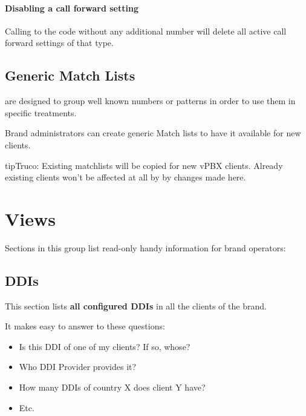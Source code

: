 \documentclass[letterpaper,10pt,spanish]{sphinxmanual}
\begin{document}
\paragraph{Disabling a call forward setting}

Calling to the code without any additional number will delete all active call forward settings of that type.


\subsection{Generic Match Lists}
\label{administration_portal/brand/settings/generic_match_lists:generic-match-lists}\label{administration_portal/brand/settings/generic_match_lists::doc}\label{administration_portal/brand/settings/generic_match_lists:brand-match-lists}
{\hyperref[administration_portal/client/vpbx/routing_tools/match_lists:id1]{}} are designed to group well known numbers or patterns in order to use them in specific treatments.

Brand administrators can create generic Match lists to have it available for new clients.

\begin{notice}{tip}{Truco:}
Existing matchlists will be copied for new vPBX clients. Already existing clients won't be affected at all by
by changes made here.
\end{notice}


\section{Views}
\label{administration_portal/brand/views/index::doc}\label{administration_portal/brand/views/index:views}
Sections in this group list read-only handy information for brand operators:


\subsection{DDIs}
\label{administration_portal/brand/views/ddis:ddis}\label{administration_portal/brand/views/ddis::doc}\label{administration_portal/brand/views/ddis:id1}
This section lists \textbf{all configured DDIs} in all the clients of the brand.

It makes easy to answer to these questions:
\begin{itemize}
\item {} 
Is this DDI of one of my clients? If so, whose?

\item {} 
Who DDI Provider provides it?

\item {} 
How many DDIs of country X does client Y have?

\item {} 
Etc.

\end{itemize}
\end{document}
